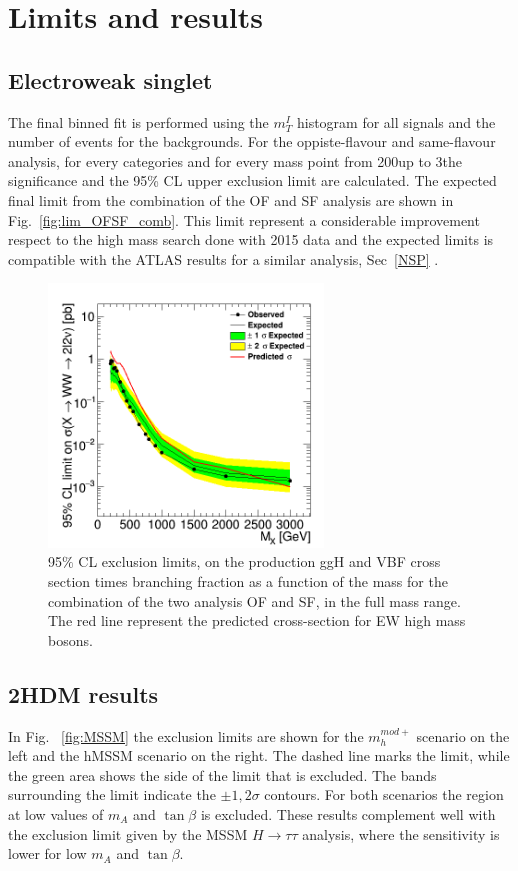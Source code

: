 
\section{Limits and results}

\subsection*{Electroweak singlet}
The final binned fit is performed using the $m_T^I$ histogram for all signals and the number of events for the backgrounds.
For the oppiste-flavour and same-flavour analysis, for every categories and for every mass point from
200\GeV up to 3\TeV the significance  and the 95\% CL
upper exclusion limit are calculated.
The expected final limit from the combination of the OF and SF analysis are shown in Fig.~\ref{fig:lim_OFSF_comb}. 
This limit represent a 	considerable improvement respect to the high mass search done with 2015 data and the expected limits is compatible with the ATLAS results for a similar analysis, Sec~\ref{NSP} .\\
\begin{figure}[htb]
\centering
\includegraphics[width=0.65\textwidth]{../AN/Figs/unblinding/Limits/c2_FullComb_unbl.png}
\caption{95$\%$ CL exclusion limits,  on the production ggH and VBF cross section times branching fraction as a function of the mass for the  combination of the two analysis OF and SF, in the full mass range.   The red  line represent the predicted cross-section for EW high mass bosons.}
\label{fig:sig_OFSF_comb}
\end{figure}


\subsection*{2HDM results}
In Fig. ~\ref{fig:MSSM} the exclusion limits are shown for the $m_h^{mod+}$ scenario on the left and the hMSSM scenario on the right. The dashed line marks the limit, while the green area shows the side of the limit that is excluded. The bands surrounding the limit indicate the $\pm 1,2\sigma$ contours. For both scenarios the region at low values of $m_{A}$ and $\tan\beta$ is excluded. These results complement well with the exclusion limit given by the MSSM $H\rightarrow\tau\tau$ analysis, where the sensitivity is lower for low $m_{A}$ and $\tan\beta$.

